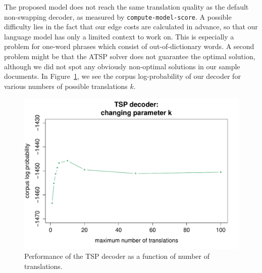 The proposed model does not reach the same translation quality as the
default non-swapping decoder, as measured by \texttt{compute-model-score}.
A possible difficulty lies in the fact that our edge costs are calculated in
advance, so that our language model has only a limited context to work on.
This is especially a problem for one-word phrases which consist of
out-of-dictionary words. A second problem might be that the \textsc{ATSP}
solver does not guarantee the optimal solution, although we did not spot any
obviously non-optimal solutions in our sample documents. In
Figure~\ref{decode3}, we see the corpus log-probability of our decoder for
various numbers of possible translations $k$.

\begin{figure}
	\centering
	\includegraphics[scale=.5]{figures/TSP_k.pdf}
	\caption{Performance of the TSP decoder as a function of number of translations.}\label{decode3}
\end{figure}
